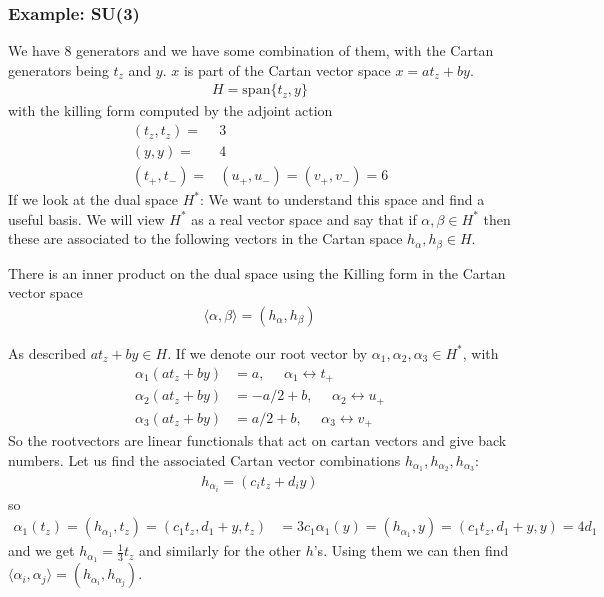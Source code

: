 \documentclass[a4paper,12pt]{article}
\begin{document}
\subsubsection{Example: SU(3)}
We have 8 generators and we have some combination of them, with the Cartan generators being $t_z$ and $y$. $x$ is part of the Cartan vector space $x=a t_z+b y$. 
\begin{equation}
	\begin{aligned}
		H=\text{span}\{t_z,y\}
	\end{aligned}
\end{equation}
with the killing form computed by the adjoint action
\begin{equation}
	\begin{aligned}
		(t_z,t_z)=&3\\
		(y,y)=&4\\
		(t_+,t_-)=&(u_+,u_-)=(v_+,v_-)=6
	\end{aligned}
\end{equation}
If we look at the dual space $H^*$: We want to understand this space and find a useful basis. We will view $H^*$ as a real vector space and say that if $\alpha,\beta \in H^*$ then these are associated to the following vectors in the Cartan space $h_\alpha,h_\beta\in H$.

There is an inner product on the dual space using the Killing form in the Cartan vector space
\begin{equation}
	\begin{aligned}
		\langle\alpha ,\beta \rangle=(h_\alpha,h_\beta)
	\end{aligned}
\end{equation}

As described $at_z+by\in H$. If we denote our root vector by $\alpha_1,\alpha_2,\alpha_3\in H^*$, with
\begin{equation}
	\begin{aligned}
		\alpha_1(at_z+by)&=a,~~~~~~\alpha_1\leftrightarrow t_+ \\
		\alpha_2(at_z+by)&=-a/2+b,~~~~~~\alpha_2\leftrightarrow u_+ \\
		\alpha_3(at_z+by)&=a/2+b,~~~~~~\alpha_3\leftrightarrow v_+ 
	\end{aligned}
\end{equation} 
So the rootvectors are linear functionals that act on cartan vectors and give back numbers. Let us find the associated Cartan vector combinations $h_{\alpha_1},h_{\alpha_2},h_{\alpha_3}$:
\begin{equation}
	\begin{aligned}
		h_{\alpha_i}=(c_it_z+d_i y)
	\end{aligned}
\end{equation}
so 
\begin{equation}
	\begin{aligned}
		\alpha_1(t_z)=(h_{\alpha_1},t_z)=(c_1 t_z, d_1+y, t_z)&=3c_1
		\alpha_1(y)=(h_{\alpha_1},y)=(c_1 t_z, d_1+y, y)=4d_1
	\end{aligned}
\end{equation}
and we get $h_{\alpha_1}=\frac{1}{3}t_z$ and similarly for the other $h$'s. Using them we can then find $\langle\alpha_i,\alpha_j\rangle=(h_{\alpha_i},h_{\alpha_j})$.
\end{document}
